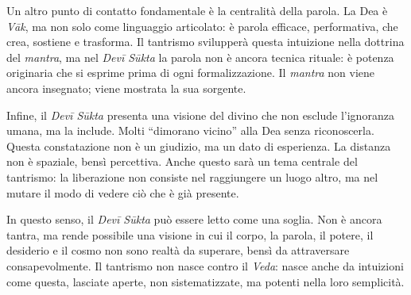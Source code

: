 Un altro punto di contatto fondamentale è la centralità della parola. La Dea è \textit{Vāk}, ma non solo come linguaggio articolato: è parola efficace, performativa, che crea, sostiene e trasforma. Il tantrismo svilupperà questa intuizione nella dottrina del \textit{mantra}, ma nel \textit{Devī Sūkta} la parola non è ancora tecnica rituale: è potenza originaria che si esprime prima di ogni formalizzazione. Il \textit{mantra} non viene ancora insegnato; viene mostrata la sua sorgente.

Infine, il \textit{Devī Sūkta }presenta una visione del divino che non esclude l’ignoranza umana, ma la include. Molti “dimorano vicino” alla Dea senza riconoscerla. Questa constatazione non è un giudizio, ma un dato di esperienza. La distanza non è spaziale, bensì percettiva. Anche questo sarà un tema centrale del tantrismo: la liberazione non consiste nel raggiungere un luogo altro, ma nel mutare il modo di vedere ciò che è già presente.

In questo senso, il \textit{Devī Sūkta} può essere letto come una soglia. Non è ancora tantra, ma rende possibile una visione in cui il corpo, la parola, il potere, il desiderio e il cosmo non sono realtà da superare, bensì da attraversare consapevolmente. Il tantrismo non nasce contro il \textit{Veda}: nasce anche da intuizioni come questa, lasciate aperte, non sistematizzate, ma potenti nella loro semplicità.

